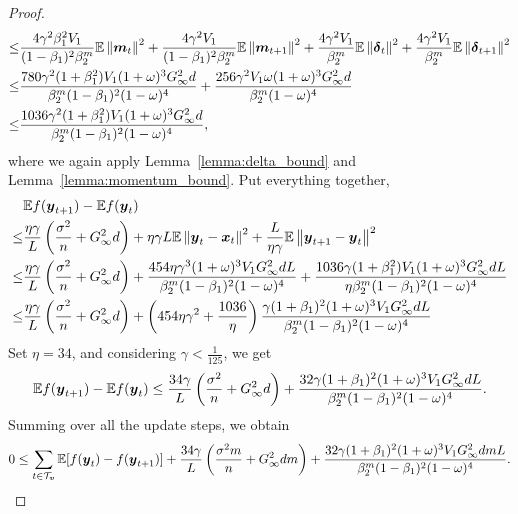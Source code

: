 \begin{proof}
\begin{align*}
\leq & \frac{4\gamma^2\beta_1^2V_1}{(1-\beta_1)^2\beta_2^m}\mathbb{E} \left\|\boldsymbol{m}_t\right\|^2 + \frac{4\gamma^2V_1}{(1-\beta_1)^2\beta_2^m}\mathbb{E} \left\|\boldsymbol{m}_{t+1}\right\|^2 + \frac{4\gamma^2V_1}{\beta_2^m}\mathbb{E}\left\| \boldsymbol{\delta}_{t}\right\|^2 + \frac{4\gamma^2V_1}{\beta_2^m}\mathbb{E}\left\|\boldsymbol{\delta}_{t+1}\right\|^2 \\
    \leq & \frac{780\gamma^2(1+\beta_1^2)V_1(1+\omega)^3 G_\infty^2d}{\beta_2^m(1-\beta_1)^2(1-\omega)^4} + \frac{256\gamma^2V_1\omega(1+\omega)^3 G_\infty^2d}{\beta_2^m(1-\omega)^4} \\
\leq & \frac{1036\gamma^2(1+\beta_1^2)V_1(1+\omega)^3 G_\infty^2d}{\beta_2^m(1-\beta_1)^2(1-\omega)^4},
\end{align*}
where we again apply Lemma~\ref{lemma:delta_bound} and Lemma~\ref{lemma:momentum_bound}.
Put everything together,
\begin{align*}
    & \mathbb E f(\boldsymbol{y}_{t+1}) - \mathbb Ef(\boldsymbol{y}_{t})\\
    \leq & \frac{\eta\gamma}{L}\left(\frac{\sigma^2}{n} + G_\infty^2d \right) + \eta\gamma L\mathbb E\left\| \boldsymbol{y}_t - \boldsymbol{x}_t\right\|^2 + \frac{L}{\eta\gamma}\mathbb E\left\|\boldsymbol{y}_{t+1} - \boldsymbol{y}_t \right\|^2 \\
\leq & \frac{\eta\gamma}{L}\left(\frac{\sigma^2}{n} + G_\infty^2d \right) + \frac{454\eta\gamma^3(1+\omega)^3V_1G_\infty^2dL}{\beta_2^m(1-\beta_1)^2(1-\omega)^4} + \frac{1036\gamma(1+\beta_1^2)V_1(1+\omega)^3 G_\infty^2dL}{\eta\beta_2^m(1-\beta_1)^2(1-\omega)^4} \\
    \leq & \frac{\eta\gamma}{L}\left(\frac{\sigma^2}{n} + G_\infty^2d \right) + \left( 454\eta\gamma^2 + \frac{1036}{\eta}\right)\frac{\gamma(1+\beta_1)^2(1+\omega)^3V_1G_\infty^2dL}{\beta_2^m(1-\beta_1)^2(1-\omega)^4}
\end{align*}
Set $\eta=34$, and considering $\gamma < \frac{1}{125}$, we get 
\begin{align*}
    \mathbb E f(\boldsymbol{y}_{t+1}) - \mathbb Ef(\boldsymbol{y}_{t})\leq\frac{34\gamma}{L}\left(\frac{\sigma^2}{n} + G_\infty^2d \right) + \frac{32\gamma(1+\beta_1)^2(1+\omega)^3V_1G_\infty^2dL}{\beta_2^m(1-\beta_1)^2(1-\omega)^4}.
\end{align*}
Summing over all the update steps, we obtain
\begin{align*}
    0 \leq \sum_{t\in\mathcal{T}_{\boldsymbol{v}}}\mathbb{E}[f(\boldsymbol{y}_{t}) - f(\boldsymbol{y}_{t+1})] + \frac{34\gamma}{L}\left(\frac{\sigma^2m}{n} + G_\infty^2dm\right) + \frac{32\gamma(1+\beta_1)^2(1+\omega)^3V_1G_\infty^2dmL}{\beta_2^m(1-\beta_1)^2(1-\omega)^4}.
\end{align*}

\end{proof}
